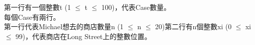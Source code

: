 第一行有一個整數t (1 $\leq$ t $\leq$ 100)，代表Case數量。\\
每個Case有兩行。\\
第一行代表Michael想去的商店數量n (1 $\leq$ n $\leq$ 20)第二行有n個整數xi (0 $\leq$ xi $\leq$ 99)，代表商店在Long Street上的整數位置。\\

